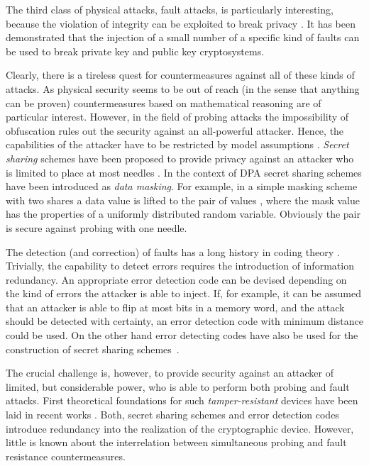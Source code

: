 \documentclass[11pt]{llncs}
\begin{document}
The third class of physical attacks, fault attacks, is
particularly interesting, because the violation of integrity
can be exploited to break privacy
\cite{Anderson1996TamperResistance-,Skorobogatov2003OpticalFaultInduction}.
It has been demonstrated that the injection of a small
number of a specific kind of faults can be used to break
private key
\cite{Biham1997DifferentialFaultAnalysis}
and public key
\cite{Boneh2001ImportanceofEliminating}
cryptosystems.

Clearly, there is a tireless quest for countermeasures against all
of these kinds of attacks. As physical security seems to be out of
reach (in the sense that anything can be proven) countermeasures
based on mathematical reasoning are of particular interest. However,
in the field of probing attacks the impossibility of obfuscation
\cite{Barak2001Impossibilityofobfuscating} rules out the security
against an all-powerful attacker. Hence, the capabilities of the
attacker have to be restricted by model assumptions
\cite{Micali2004PhysicallyObservableCryptography}. \emph{Secret
sharing} schemes have been proposed to provide privacy against an
attacker who is limited to place at most  needles
\cite{Ishai2003PrivateCircuits:Securing}. In the context of DPA
secret sharing schemes have been introduced as \emph{data masking}.
For example, in a simple masking scheme with two shares a data value
 is lifted to the pair of values , where the mask
value  has the properties of a uniformly distributed random
variable. Obviously the pair  is secure against
probing with one needle.

The detection (and correction) of faults has a
long history in coding theory
\cite{MacWilliams2006TheoryofError-Correcting,Shannon1949CommunicationTheoryof}.
Trivially, the capability to detect errors requires the
introduction of information redundancy.
An appropriate error detection code can be devised depending on
the kind of errors the attacker is able to inject.
If, for example, it can be assumed that an attacker is able to
flip at most  bits in a memory word, and the attack
should be detected with certainty, an error detection
code with minimum distance  could be used.
On the other hand
error detecting codes have also be used for the construction of
secret sharing schemes~\cite{Massey1993MinimalCodewordsand}.

The crucial challenge is, however,
to provide security against an attacker of limited, but considerable power,
who is able to perform both probing and fault attacks.
First theoretical foundations for such \emph{tamper-resistant} devices
have been laid in recent works
\cite{Gennaro2004AlgorithmicTamperProof,Ishai2006PrivateCircuitsII}.
Both, secret sharing schemes and error detection codes introduce
redundancy into the realization of the cryptographic device.
However, little is known about the interrelation between simultaneous probing and
fault resistance countermeasures.
\end{document}
